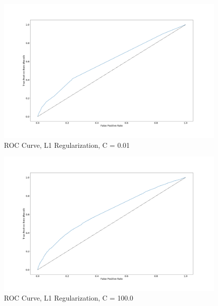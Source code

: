 \documentclass[sigconf]{acmart}
\begin{document}
\begin{figure}[!ht]
  \centering\includegraphics[width=\columnwidth]{images/roccurve001.png}
  \caption{ROC Curve, L1 Regularization, C = 0.01}\label{f:roccurve001}
\end{figure}

\begin{figure}[!ht]
  \centering\includegraphics[width=\columnwidth]{images/roccurve100.png}
  \caption{ROC Curve, L1 Regularization, C = 100.0}\label{f:roccurve100}
\end{figure}
\end{document}
